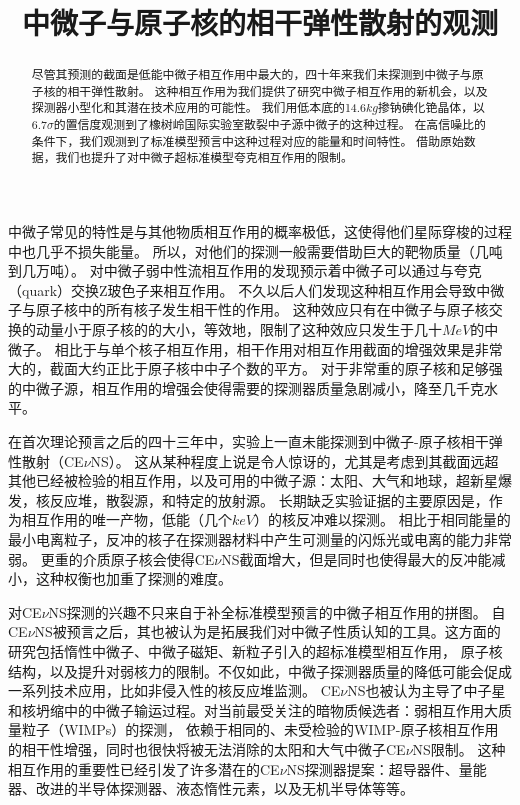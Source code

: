 
\begin{translation}
\label{cha:translation}

\title{中微子与原子核的相干弹性散射的观测}
\maketitle

\tableofcontents

\begin{abstract}
  尽管其预测的截面是低能中微子相互作用中最大的，四十年来我们未探测到中微子与原子核的相干弹性散射。
  这种相互作用为我们提供了研究中微子相互作用的新机会，以及探测器小型化和其潜在技术应用的可能性。
  我们用低本底的14.6$\si{kg}$掺钠碘化铯晶体，以6.7$\sigma$的置信度观测到了橡树岭国际实验室散裂中子源中微子的这种过程。
  在高信噪比的条件下，我们观测到了标准模型预言中这种过程对应的能量和时间特性。
  借助原始数据，我们也提升了对中微子超标准模型夸克相互作用的限制。
\end{abstract}

中微子常见的特性是与其他物质相互作用的概率极低，这使得他们星际穿梭的过程中也几乎不损失能量。
所以，对他们的探测一般需要借助巨大的靶物质量（几吨到几万吨）。
对中微子弱中性流相互作用的发现预示着中微子可以通过与夸克（quark）交换Z玻色子来相互作用。
不久以后人们发现这种相互作用会导致中微子与原子核中的所有核子发生相干性的作用。
这种效应只有在中微子与原子核交换的动量小于原子核的的大小，等效地，限制了这种效应只发生于几十$\si{MeV}$的中微子。
相比于与单个核子相互作用，相干作用对相互作用截面的增强效果是非常大的，截面大约正比于原子核中中子个数的平方。
对于非常重的原子核和足够强的中微子源，相互作用的增强会使得需要的探测器质量急剧减小，降至几千克水平。

在首次理论预言之后的四十三年中，实验上一直未能探测到中微子-原子核相干弹性散射（CE$\nu$NS）。
这从某种程度上说是令人惊讶的，尤其是考虑到其截面远超其他已经被检验的相互作用，以及可用的中微子源：太阳、大气和地球，超新星爆发，核反应堆，散裂源，和特定的放射源。
长期缺乏实验证据的主要原因是，作为相互作用的唯一产物，低能（几个$\si{keV}$）的核反冲难以探测。
相比于相同能量的最小电离粒子，反冲的核子在探测器材料中产生可测量的闪烁光或电离的能力非常弱。
更重的介质原子核会使得CE$\nu$NS截面增大，但是同时也使得最大的反冲能减小，这种权衡也加重了探测的难度。

对CE$\nu$NS探测的兴趣不只来自于补全标准模型预言的中微子相互作用的拼图。
自CE$\nu$NS被预言之后，其也被认为是拓展我们对中微子性质认知的工具。这方面的研究包括惰性中微子、中微子磁矩、新粒子引入的超标准模型相互作用，
原子核结构，以及提升对弱核力的限制。不仅如此，中微子探测器质量的降低可能会促成一系列技术应用，比如非侵入性的核反应堆监测。
CE$\nu$NS也被认为主导了中子星和核坍缩中的中微子输运过程。对当前最受关注的暗物质候选者：弱相互作用大质量粒子（WIMPs）的探测，
依赖于相同的、未受检验的WIMP-原子核相互作用的相干性增强，同时也很快将被无法消除的太阳和大气中微子CE$\nu$NS限制。
这种相互作用的重要性已经引发了许多潜在的CE$\nu$NS探测器提案：超导器件、量能器、改进的半导体探测器、液态惰性元素，以及无机半导体等等。


\end{translation}
